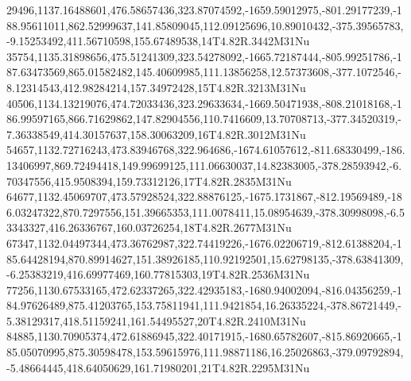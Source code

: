 29496,1137.16488601,476.58657436,323.87074592,-1659.59012975,-801.29177239,-188.95611011,862.52999637,141.85809045,112.09125696,10.89010432,-375.39565783,-9.15253492,411.56710598,155.67489538,14T4.82R.3442M31Nu
35754,1135.31898656,475.51241309,323.54278092,-1665.72187444,-805.99251786,-187.63473569,865.01582482,145.40609985,111.13856258,12.57373608,-377.1072546,-8.12314543,412.98284214,157.34972428,15T4.82R.3213M31Nu
40506,1134.13219076,474.72033436,323.29633634,-1669.50471938,-808.21018168,-186.99597165,866.71629862,147.82904556,110.7416609,13.70708713,-377.34520319,-7.36338549,414.30157637,158.30063209,16T4.82R.3012M31Nu
54657,1132.72716243,473.83946768,322.964686,-1674.61057612,-811.68330499,-186.13406997,869.72494418,149.99699125,111.06630037,14.82383005,-378.28593942,-6.70347556,415.9508394,159.73312126,17T4.82R.2835M31Nu
64677,1132.45069707,473.57928524,322.88876125,-1675.1731867,-812.19569489,-186.03247322,870.7297556,151.39665353,111.0078411,15.08954639,-378.30998098,-6.53343327,416.26336767,160.03726254,18T4.82R.2677M31Nu
67347,1132.04497344,473.36762987,322.74419226,-1676.02206719,-812.61388204,-185.64428194,870.89914627,151.38926185,110.92192501,15.62798135,-378.63841309,-6.25383219,416.69977469,160.77815303,19T4.82R.2536M31Nu
77256,1130.67533165,472.62337265,322.42935183,-1680.94002094,-816.04356259,-184.97626489,875.41203765,153.75811941,111.9421854,16.26335224,-378.86721449,-5.38129317,418.51159241,161.54495527,20T4.82R.2410M31Nu
84885,1130.70905374,472.61886945,322.40171915,-1680.65782607,-815.86920665,-185.05070995,875.30598478,153.59615976,111.98871186,16.25026863,-379.09792894,-5.48664445,418.64050629,161.71980201,21T4.82R.2295M31Nu
